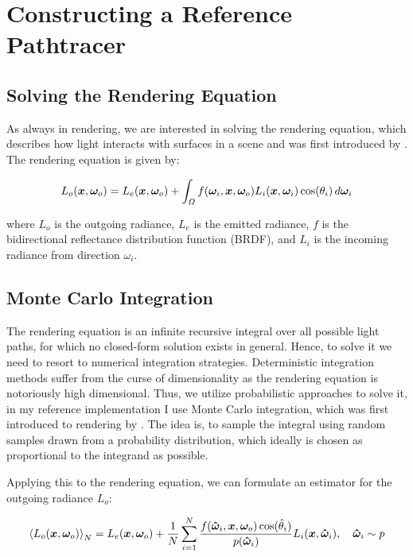 
\chapter{Constructing a Reference Pathtracer}
\label{chap:pathtracing}

\section{Solving the Rendering Equation}

As always in rendering, we are interested in solving the rendering equation, which describes how light interacts with surfaces in a scene and was first introduced by \textcite{kajiya1986}.
The rendering equation is given by:

\begin{equation}
\label{eq:rendering_equation}
    L_o(\bm{x}, \bm{\omega}_o) = L_e(\bm{x}, \bm{\omega}_o) + \int_{\Omega} f(\bm{\omega}_i, \bm{x}, \bm{\omega}_o) L_i(\bm{x}, \bm{\omega}_i) \cos(\theta_i) \mathop{}\!d\bm{\omega}_i
\end{equation}

where $L_o$ is the outgoing radiance, $L_e$ is the emitted radiance, $f$ is the bidirectional reflectance distribution function (BRDF), and $L_i$ is the incoming radiance from direction $\omega_i$.

\section{Monte Carlo Integration}

The rendering equation is an infinite recursive integral over all possible light paths, for which no closed-form solution exists in general.
Hence, to solve it we need to resort to numerical integration strategies.
Deterministic integration methods suffer from the curse of dimensionality as the rendering equation is notoriously high dimensional.
Thus, we utilize probabilistic approaches to solve it, in my reference implementation I use Monte Carlo integration, which was first introduced to rendering by \textcite{kajiya1986}.
The idea is, to sample the integral using random samples drawn from a probability distribution, which ideally is chosen as proportional to the integrand as possible.

Applying this to the rendering equation, we can formulate an estimator for the outgoing radiance $L_o$:

\begin{equation}
    \estimator{L_o(\vec{x}, \wo)} = L_e(\vec{x}, \wo) + \frac{1}{N} \sum_{i=1}^{N} \frac{f(\vec{\hat{\omega}}_i, \vec{x}, \wo) \cos(\hat{\theta}_i)}{p(\vec{\hat{\omega}}_i)} L_i(\vec{x}, \vec{\hat{\omega}}_i), \quad \vec{\hat{\omega}}_i \sim p
\end{equation}

